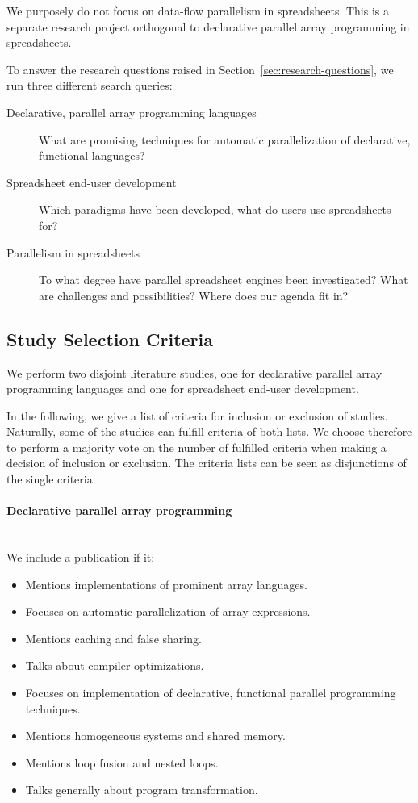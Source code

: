 \documentclass[a4paper]{article}
\begin{document}
We purposely do not focus on data-flow parallelism in spreadsheets. This is a separate research project orthogonal to declarative parallel array programming in spreadsheets.

To answer the research questions raised in Section~\ref{sec:research-questions}, we run three different search queries:

\begin{description}
\item[Declarative, parallel array programming languages] What are
  promising techniques for automatic parallelization of declarative,
  functional languages?
\item[Spreadsheet end-user development] Which paradigms have been
  developed, what do users use spreadsheets for?
\item[Parallelism in spreadsheets] To what degree have parallel
  spreadsheet engines been investigated? What are challenges and
  possibilities? Where does our agenda fit in?
\end{description}

\subsection{Study Selection Criteria}
\label{sec:study-select-crit}

We perform two disjoint literature studies, one for declarative parallel array programming languages and one for spreadsheet end-user development.

In the following, we give a list of criteria for inclusion or exclusion of studies. Naturally, some of the studies can fulfill criteria of both lists. We choose therefore to perform a majority vote on the number of fulfilled criteria when making a decision of inclusion or exclusion. The criteria lists can be seen as disjunctions of the single criteria.

\paragraph{Declarative parallel array programming}
~\\

We include a publication if it:

\begin{itemize}
\item Mentions implementations of prominent array languages.
\item Focuses on automatic parallelization of array expressions.
\item Mentions caching and false sharing.
\item Talks about compiler optimizations.
\item Focuses on implementation of declarative, functional parallel
  programming techniques.
\item Mentions homogeneous systems and shared memory.
\item Mentions loop fusion and nested loops.
\item Talks generally about program transformation.
\end{itemize}
\end{document}
